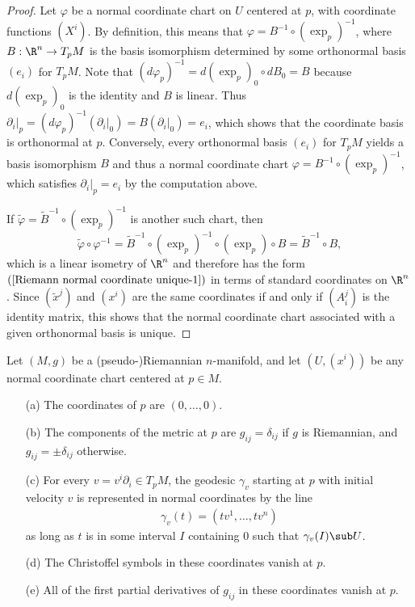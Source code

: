 \begin{proof}
Let $\varphi$ be a normal coordinate chart on $U$ centered at $p$, with coordinate functions $(X^i)$. By definition, this means that $\varphi=B^{-1}\circ(\exp_p)^{-1}$, 
where $B:\R^n\to T_pM$ is the basis isomorphism determined by some orthonormal basis $(e_i)$ for $T_pM$. Note that $(d\varphi_p)^{-1}=d(\exp_p)_0\circ dB_0=B$ because 
$d(\exp_p)_0$ is the identity and $B$ is linear. Thus $\partial_i|_p=(d\varphi_p)^{-1}(\partial_i|_0)=B(\partial_i|_0)=e_i$, which shows that the coordinate basis is 
orthonormal at $p$. Conversely, every orthonormal basis $(e_i)$ for $T_pM$ yields a basis isomorphism $B$ and thus a normal coordinate chart $\varphi=B^{-1}\circ(\exp_p)^{-1}$, 
which satisfies $\partial_i|_p=e_i$ by the computation above.\par
If $\widetilde{\varphi}=\widetilde{B}^{-1}\circ(\exp_p)^{-1}$ is another such chart, then
\[\widetilde{\varphi}\circ\varphi^{-1}=\widetilde{B}^{-1}\circ(\exp_p)^{-1}\circ(\exp_p)\circ B=\widetilde{B}^{-1}\circ B,\]
which is a linear isometry of $\R^n$ and therefore has the form $(\ref{Riemann normal coordinate unique-1})$ in terms of standard coordinates on $\R^n$. Since $(\widetilde{x}^j)$ and $(x^i)$ are the same 
coordinates if and only if $(A_i^j)$ is the identity matrix, this shows that the normal coordinate chart associated with a given orthonormal basis is unique.
\end{proof}
\begin{proposition}\label{Riemann normal coordinate prop}
Let $(M,g)$ be a (pseudo-)Riemannian $n$-manifold, and let $(U,(x^i))$ be any normal coordinate chart centered at $p\in M$.
\begin{itemize}
\item[(a)] The coordinates of $p$ are $(0,\dots,0)$.
\item[(b)] The components of the metric at $p$ are $g_{ij}=\delta_{ij}$ if $g$ is Riemannian, and $g_{ij}=\pm\delta_{ij}$ otherwise.
\item[(c)] For every $v=v^i\partial_i\in T_pM$, the geodesic $\gamma_v$ starting at $p$ with initial velocity $v$ is represented in normal coordinates by the line
\begin{align}\label{Riemann normal coordinate prop-1}
\gamma_v(t)=(tv^1,\dots,tv^n)
\end{align} 
as long as $t$ is in some interval $I$ containing $0$ such that $\gamma_v(I)\sub U$.
\item[(d)] The Christoffel symbols in these coordinates vanish at $p$.
\item[(e)] All of the first partial derivatives of $g_{ij}$ in these coordinates vanish at $p$.
\end{itemize}
\end{proposition}
